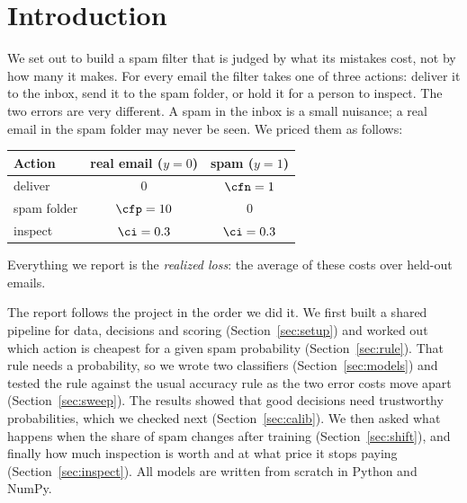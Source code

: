\section{Introduction}
\label{sec:intro}

We set out to build a spam filter that is judged by what its mistakes cost, not by how many it
makes. For every email the filter takes one of three actions: deliver it to the inbox, send it to the
spam folder, or hold it for a person to inspect. The two errors are very different. A spam in the
inbox is a small nuisance; a real email in the spam folder may never be seen. We priced them as
follows:
\begin{center}
\small
\begin{tabular}{lcc}
\toprule
Action & real email ($y=0$) & spam ($y=1$) \\
\midrule
deliver       & $0$           & $\cfn=1$ \\
spam folder   & $\cfp=10$     & $0$ \\
inspect       & $\ci=0.3$     & $\ci=0.3$ \\
\bottomrule
\end{tabular}
\end{center}
Everything we report is the \emph{realized loss}: the average of these costs over held-out emails.

The report follows the project in the order we did it. We first built a shared pipeline for data,
decisions and scoring (Section~\ref{sec:setup}) and worked out which action is cheapest for a given
spam probability (Section~\ref{sec:rule}). That rule needs a probability, so we wrote two classifiers
(Section~\ref{sec:models}) and tested the rule against the usual accuracy rule as the two error costs
move apart (Section~\ref{sec:sweep}). The results showed that good decisions need trustworthy
probabilities, which we checked next (Section~\ref{sec:calib}). We then asked what happens when the
share of spam changes after training (Section~\ref{sec:shift}), and finally how much inspection is
worth and at what price it stops paying (Section~\ref{sec:inspect}). All models are written from scratch in Python and NumPy.
